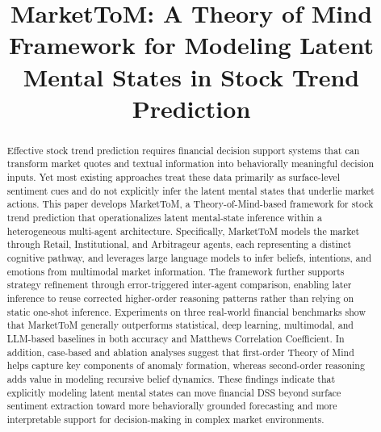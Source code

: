 \documentclass[a4paper,fleqn,doubleblind]{cas-sc}
\newcommand{\ApplyManuscriptSpacing}{%
  \setstretch{1.6}%
  \setdisplayskipstretch{0.5}
  \selectfont
}
\begin{document}
\let\WriteBookmarks\relax
\def\floatpagepagefraction{1}
\def\textpagefraction{.001}
\ApplyManuscriptSpacing



\title [mode = title]{MarketToM: A Theory of Mind Framework for Modeling Latent Mental States in Stock Trend Prediction \vspace{-30pt}}  








\begin{abstract} 
Effective stock trend prediction requires financial decision support systems that can transform market quotes and textual information into behaviorally meaningful decision inputs. Yet most existing approaches treat these data primarily as surface-level sentiment cues and do not explicitly infer the latent mental states that underlie market actions. This paper develops MarketToM, a Theory-of-Mind-based framework for stock trend prediction that operationalizes latent mental-state inference within a heterogeneous multi-agent architecture. Specifically, MarketToM models the market through Retail, Institutional, and Arbitrageur agents, each representing a distinct cognitive pathway, and leverages large language models to infer beliefs, intentions, and emotions from multimodal market information. The framework further supports strategy refinement through error-triggered inter-agent comparison, enabling later inference to reuse corrected higher-order reasoning patterns rather than relying on static one-shot inference. Experiments on three real-world financial benchmarks show that MarketToM generally outperforms statistical, deep learning, multimodal, and LLM-based baselines in both accuracy and Matthews Correlation Coefficient. In addition, case-based and ablation analyses suggest that first-order Theory of Mind helps capture key components of anomaly formation, whereas second-order reasoning adds value in modeling recursive belief dynamics. These findings indicate that explicitly modeling latent mental states can move financial DSS beyond surface sentiment extraction toward more behaviorally grounded forecasting and more interpretable support for decision-making in complex market environments.
\vspace{-10pt}
\end{abstract}
\end{document}

